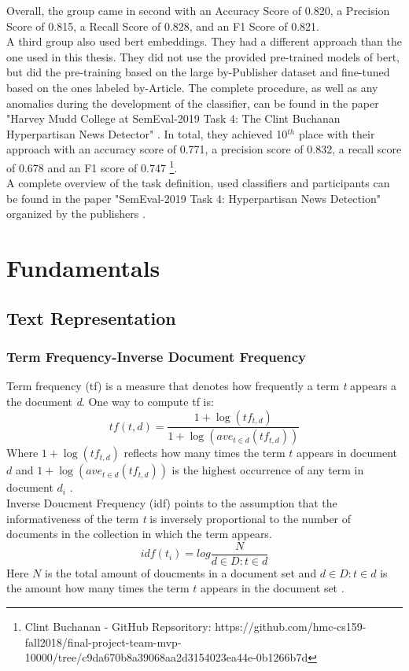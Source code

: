 \documentclass[a4paper, 11pt,titlepage,oneside,openany]{book}
\begin{document}
\newpage 
\noindent Overall, the group came in second with an Accuracy Score of 0.820, a Precision Score of 0.815, a Recall Score of 0.828, and an F1 Score of 0.821. \\
\indent A third group also used \gls{bert} embeddings. They had a different approach than the one used in this thesis. They did not use the provided pre-trained models of \gls{bert}, but did the pre-training based on the large by-Publisher dataset and fine-tuned based on the ones labeled by-Article. The complete procedure, as well as any anomalies during the development of the classifier, can be found in the paper "Harvey Mudd College at SemEval-2019 Task 4: The Clint Buchanan Hyperpartisan News Detector" \cite{bertgruppe}. In total, they achieved 10$^{th}$ place with their approach with an accuracy score of 0.771, a precision score of 0.832, a recall score of 0.678 and an F1 score of 0.747 \footnote{Clint Buchanan - GitHub Repsoritory: https://github.com/hmc-cs159-fall2018/final-project-team-mvp-10000/tree/c9da670b8a39068aa2d3154023ea44e-0b1266b7d}. \\
\indent A complete overview of the task definition, used classifiers and participants can be found in the paper "SemEval-2019 Task 4: Hyperpartisan News Detection" organized by the publishers \cite{hyperpartisannewsdetection}.


\chapter{Fundamentals}
\section{Text Representation}
\subsection{Term Frequency-Inverse Document Frequency}
\indent Term frequency (\gls{tf}) is a measure that denotes how frequently a term \textit{t} appears a the document \textit{d}. One way to compute \gls{tf} is:\\
\[
tf(t,d)=\frac{1+\log(tf_{t,d})}{1+\log(ave_{t\in d}(tf_{t,d}))}
\]
Where $1+\log(tf_{t,d})$ reflects how many times the term $t$ appears in document $d$ and $1+\log(ave_{t\in d}(tf_{t,d}))$ is the highest occurrence of any term in document $d_i$ \cite{IR-book}.\\

\indent Inverse Doucment Frequency (\gls{idf}) points to the assumption that the informativeness of the term \textit{t} is inversely proportional to the number of documents in the collection in which the term appears.\\
\[
idf(t_i)=log\frac{N}{d \in D : t \in d}
\]
Here $N$ is the total amount of doucments in a document set and $d \in D : t \in d$ is the amount how many times the term $t$ appears in the document set \cite{IR-book}.\\
\end{document}
